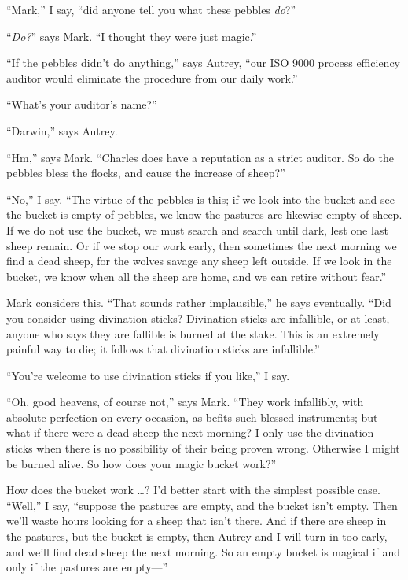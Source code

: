 {
 ``Mark,'' I say,
``did anyone tell you what these pebbles
\textit{do}?''}

{
 ``\textit{Do?}'' says Mark.
``I thought they were just magic.''}

{
 ``If the pebbles didn't do
anything,'' says Autrey, ``our ISO
9000 process efficiency auditor would eliminate the procedure from our
daily work.''}

{
 ``What's your
auditor's name?''}

{
 ``Darwin,'' says Autrey.}

{
 ``Hm,'' says Mark.
``Charles does have a reputation as a strict auditor.
So do the pebbles bless the flocks, and cause the increase of
sheep?''}

{
 ``No,'' I say.
``The virtue of the pebbles is this; if we look into
the bucket and see the bucket is empty of pebbles, we know the pastures
are likewise empty of sheep. If we do not use the bucket, we must
search and search until dark, lest one last sheep remain. Or if we stop
our work early, then sometimes the next morning we find a dead sheep,
for the wolves savage any sheep left outside. If we look in the bucket,
we know when all the sheep are home, and we can retire without
fear.''}

{
 Mark considers this. ``That sounds rather
implausible,'' he says eventually.
``Did you consider using divination sticks? Divination
sticks are infallible, or at least, anyone who says they are fallible
is burned at the stake. This is an extremely painful way to die; it
follows that divination sticks are infallible.''}

{
 ``You're welcome to use
divination sticks if you like,'' I say.}

{
 ``Oh, good heavens, of course
not,'' says Mark. ``They work
infallibly, with absolute perfection on every occasion, as befits such
blessed instruments; but what if there were a dead sheep the next
morning? I only use the divination sticks when there is no possibility
of their being proven wrong. Otherwise I might be burned alive. So how
does your magic bucket work?''}

{
 How does the bucket work \ldots ? I'd better start
with the simplest possible case.
``Well,'' I say,
``suppose the pastures are empty, and the bucket
isn't empty. Then we'll waste hours
looking for a sheep that isn't there. And if there are
sheep in the pastures, but the bucket is empty, then Autrey and I will
turn in too early, and we'll find dead sheep the next
morning. So an empty bucket is magical if and only if the pastures are
empty---''}

